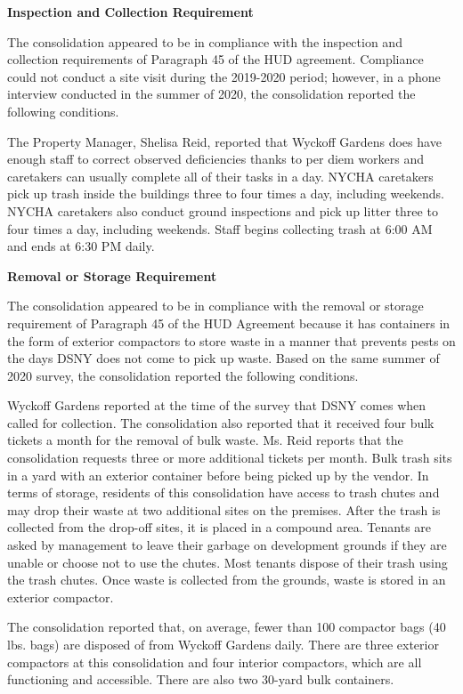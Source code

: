 
\textbf{Inspection and Collection Requirement}

The consolidation appeared to be in compliance with the inspection and collection requirements of Paragraph 45 of the HUD agreement. Compliance could not conduct a site visit during the 2019-2020 period; however, in a phone interview conducted in the summer of 2020, the consolidation reported the following conditions.

The Property Manager, Shelisa Reid, reported that Wyckoff Gardens does have enough staff to correct observed deficiencies thanks to per diem workers and caretakers can usually complete all of their tasks in a day. NYCHA caretakers pick up trash inside the buildings three to four times a day, including weekends. NYCHA caretakers also conduct ground inspections and pick up litter three to four times a day, including weekends. Staff begins collecting trash at 6:00 AM and ends at 6:30 PM daily. 

\textbf{Removal or Storage Requirement}

The consolidation appeared to be in compliance with the  removal or storage requirement of Paragraph  45 of the HUD Agreement because it has containers in the form of exterior compactors to store waste in a manner that prevents pests on the days DSNY does not come to pick up waste. Based on the same summer of  2020 survey, the consolidation reported the following conditions.

Wyckoff Gardens reported at the time of the survey that DSNY comes when called for collection. The consolidation also reported that it received four bulk tickets a month for the removal of bulk waste. Ms. Reid reports that the consolidation requests three or more additional tickets per month.  Bulk trash sits in a yard with an exterior container before being picked up by the vendor. In terms of storage, residents of this consolidation have access to trash chutes and may drop their waste at two additional sites on the premises. After the trash is collected from the drop-off sites, it is placed in a compound area. Tenants are  asked by management to leave their garbage on development grounds if they are unable or choose not to use the chutes. Most tenants dispose of their trash using the trash chutes. Once waste is collected from the grounds, waste is stored in an exterior compactor. 

The consolidation reported that, on average, fewer than 100 compactor bags (40 lbs. bags)  are disposed of from Wyckoff Gardens daily. There are three exterior compactors at this consolidation and four interior compactors, which are all functioning and accessible. There are also two 30-yard bulk containers.

